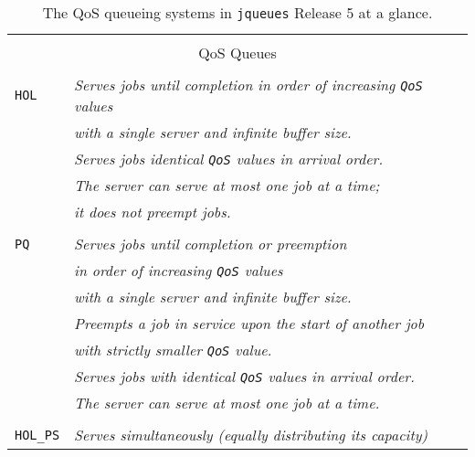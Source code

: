 \begin{table}[!htbp]
	\label{tab:qos-queues}
	\caption{The QoS queueing systems
             in \texttt{jqueues} Release 5
             at a glance.}
	\begin{center}
		\begin{tabular}{|l|l|}
			\hline
			\multicolumn{2}{|c|}{} \\
			\multicolumn{2}{|c|}{QoS Queues} \\
			\multicolumn{2}{|c|}{} \\
			\hline
            \hline
			\lstinline|HOL|
              &
              {\em Serves jobs until completion
                   in order of increasing \lstinline|QoS| values}
              \\
              &
              {\em with a single server and infinite buffer size.}
              \\
              &
              {\em Serves jobs identical \lstinline|QoS|
                   values in arrival order.}
              \\
              &
              {\em The server can serve at most one job at a time;}
              \\
              &
              {\em it does not preempt jobs.}
              \\
              &
              \\
			\lstinline|PQ|
              &
              {\em Serves jobs until completion or preemption}
              \\
              &
              {\em in order of increasing \lstinline|QoS| values}
              \\
              &
              {\em with a single server and infinite buffer size.}
              \\
              &
              {\em Preempts a job in service upon the start of another job}
              \\
              &
              {\em with strictly smaller \lstinline|QoS| value.}
              \\
              &
              {\em Serves jobs with identical \lstinline|QoS|
                   values in arrival order.}
              \\
              &
              {\em The server can serve at most one job at a time.}
              \\
              &
              \\
			\lstinline|HOL_PS|
              &
              {\em Serves simultaneously (equally distributing its capacity)}

\end{tabular}
\end{center}
\end{table}
